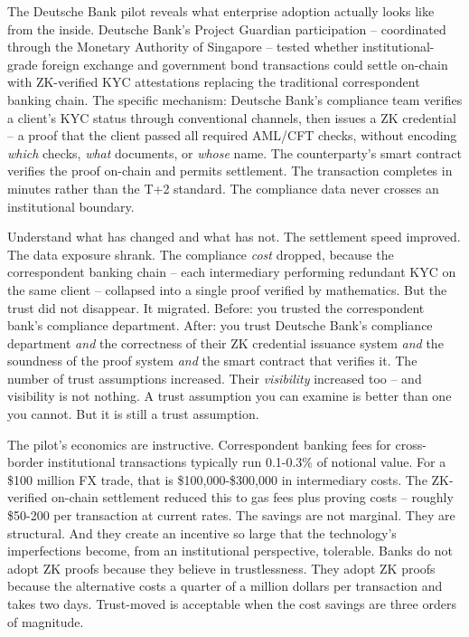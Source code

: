 \documentclass[
  11pt,
  openany]{report}
\begin{document}
The Deutsche Bank pilot reveals what enterprise adoption actually looks like
from the inside. Deutsche Bank's Project Guardian participation -- coordinated
through the Monetary Authority of Singapore -- tested whether
institutional-grade foreign exchange and government bond transactions could
settle on-chain with ZK-verified KYC attestations replacing the traditional
correspondent banking chain. The specific mechanism: Deutsche Bank's compliance
team verifies a client's KYC status through conventional channels, then issues a
ZK credential -- a proof that the client passed all required AML/CFT checks,
without encoding \emph{which} checks, \emph{what} documents, or \emph{whose}
name. The counterparty's smart contract verifies the proof on-chain and permits
settlement. The transaction completes in minutes rather than the T+2 standard.
The compliance data never crosses an institutional boundary.

Understand what has changed and what has not. The settlement speed improved. The
data exposure shrank. The compliance \emph{cost} dropped, because the
correspondent banking chain -- each intermediary performing redundant KYC on the
same client -- collapsed into a single proof verified by mathematics. But the
trust did not disappear. It migrated. Before: you trusted the correspondent
bank's compliance department. After: you trust Deutsche Bank's compliance
department \emph{and} the correctness of their ZK credential issuance system
\emph{and} the soundness of the proof system \emph{and} the smart contract that
verifies it. The number of trust assumptions increased. Their \emph{visibility}
increased too -- and visibility is not nothing. A trust assumption you can
examine is better than one you cannot. But it is still a trust assumption.

The pilot's economics are instructive. Correspondent banking fees for
cross-border institutional transactions typically run 0.1-0.3\% of notional
value. For a \$100 million FX trade, that is \$100,000-\$300,000 in intermediary
costs. The ZK-verified on-chain settlement reduced this to gas fees plus proving
costs -- roughly \$50-200 per transaction at current rates. The savings are not
marginal. They are structural. And they create an incentive so large that the
technology's imperfections become, from an institutional perspective, tolerable.
Banks do not adopt ZK proofs because they believe in trustlessness. They adopt
ZK proofs because the alternative costs a quarter of a million dollars per
transaction and takes two days. Trust-moved is acceptable when the cost savings
are three orders of magnitude.
\end{document}
